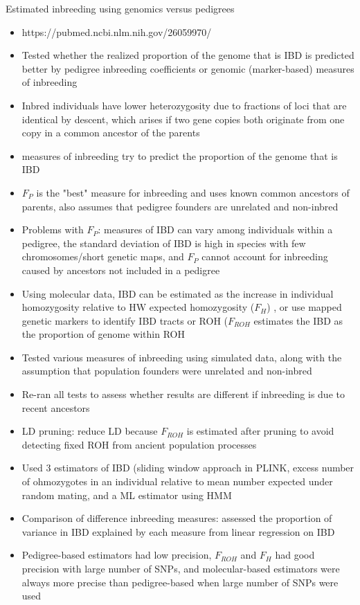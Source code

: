 \documentclass[12pt]{amsart}
\begin{document}
{\large Estimated inbreeding using genomics versus pedigrees}
\begin{itemize}
\item https://pubmed.ncbi.nlm.nih.gov/26059970/
\item Tested whether the realized proportion of the genome that is IBD is predicted better by pedigree inbreeding coefficients or genomic (marker-based) measures of inbreeding
\item Inbred individuals have lower heterozygosity due to fractions of loci that are identical by descent, which arises if two gene copies both originate from one copy in a common ancestor of the parents
\item measures of inbreeding try to predict the proportion of the genome that is IBD 
\item $F_P$ is the "best" measure for inbreeding and uses known common ancestors of parents, also assumes that pedigree founders are unrelated and non-inbred
\item Problems with $F_P$: measures of IBD can vary among individuals within a pedigree, the standard deviation of IBD is high in species with few chromosomes/short genetic maps, and $F_P$ cannot account for inbreeding caused by ancestors not included in a pedigree
\item Using molecular data, IBD can be estimated as the increase in individual homozygosity relative to HW expected homozygosity ($F_H$) , or use mapped genetic markers to identify IBD tracts or ROH ($F_{ROH}$ estimates the IBD as the proportion of genome within ROH
\item Tested various measures of inbreeding using simulated data, along with the assumption that population founders were unrelated and non-inbred
\item Re-ran all tests to assess whether results are different if inbreeding is due to recent ancestors
\item LD pruning: reduce LD because $F_{ROH}$ is estimated after pruning to avoid detecting fixed ROH from ancient population processes
\item Used 3 estimators of IBD (sliding window approach in PLINK, excess number of ohmozygotes in an individual relative to mean number expected under random mating, and a ML estimator using HMM
\item Comparison of difference inbreeding measures: assessed the proportion of variance in IBD explained by each measure from linear regression on IBD
\item Pedigree-based estimators had low precision, $F_{ROH}$ and $F_H$ had good precision with large number of SNPs, and molecular-based estimators were always more precise than pedigree-based when large number of SNPs were used 

\end{itemize}
\end{document}
